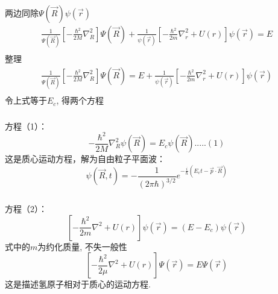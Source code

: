 \begin{frame}[label=current]
\frametitle{}
两边同除$\Psi (\vec{R}) \psi (\vec{r})$
\[
\begin{aligned}
   \frac{1}{\Psi (\vec{R})}\left[-\frac{\hbar^2}{2 M} \nabla_R ^2 \right] \Psi (\vec{R})  +  \frac{1}{\psi (\vec{r})}\left[-\frac{\hbar^2}{2 m} \nabla_r ^2 +U(r) \right]  \psi (\vec{r})=E \\ 
\end{aligned}
\]
整理
\[
\begin{aligned}
  \frac{1}{\Psi (\vec{R})}\left[-\frac{\hbar^2}{2 M} \nabla_R ^2 \right] \Psi (\vec{R})  = E +  \frac{1}{\psi (\vec{r})}\left[-\frac{\hbar^2}{2 m} \nabla_r ^2 +U(r) \right]  \psi (\vec{r}) \\ 
\end{aligned}
\]
令上式等于$E_c$, 得两个方程\\
\end{frame} 

\begin{frame}
\frametitle{}
方程（1）：
\begin{equation*}
  -\frac{\hbar^2}{2 M} \nabla_R ^2  \psi (\vec{R}) =E_c \psi (\vec{R})  ..... (1)
\end{equation*}	
这是质心运动方程，解为自由粒子平面波：
\begin{equation*}
\psi (\vec{R},t)=-\frac{1}{(2\pi\hbar)^{3/2}}e^{-\frac{i}{\hbar}(E_c t -\vec{p}\cdot\vec{R})}
\end{equation*}
\end{frame}		

\begin{frame}
\frametitle{}
方程（2）：
\begin{equation*}
  \left[-\frac{\hbar^2}{2 m} \nabla ^2 +U(r) \right] \psi (\vec{r}) =(E- E_c) \psi (\vec{r}) 
\end{equation*}
式中的$m$为约化质量, 不失一般性
\begin{equation} \label{eq:qdrb}
  \left[-\frac{\hbar^2}{2 \mu} \nabla ^2 +U(r) \right] \Psi (\vec{r}) =E \Psi (\vec{r}) 
\end{equation}
这是描述氢原子相对于质心的运动方程.\\
\end{frame}	

